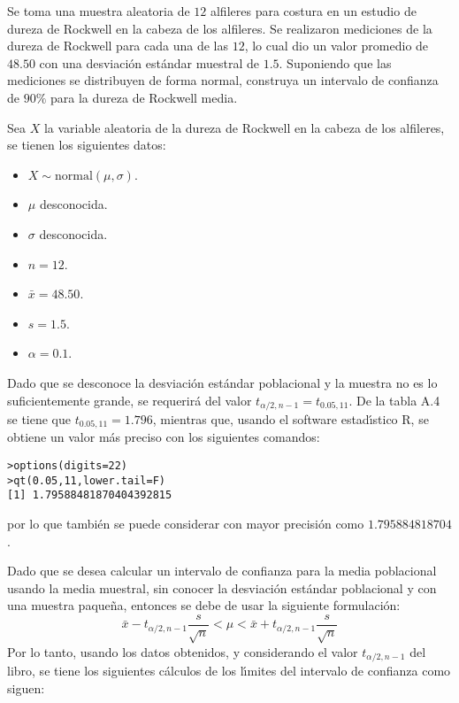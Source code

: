 \begin{enunciado}
 Se toma una muestra aleatoria de $12$ alfileres para costura en un estudio de dureza de Rockwell en la cabeza de los alfileres. Se realizaron mediciones de la dureza de Rockwell para cada una de las $12$, lo cual dio un valor promedio de $48.50$ con una desviaci\'on est\'andar muestral de $1.5$. Suponiendo que las mediciones se distribuyen de forma normal, construya un intervalo de confianza de $90\%$ para la dureza de Rockwell media.
\end{enunciado}

\begin{solucion}
 Sea $X$ la variable aleatoria de la dureza de Rockwell en la cabeza de los alfileres, se tienen los siguientes datos:
 \begin{itemize}
  \item $X\sim\text{normal}(\mu,\sigma)$.
  \item $\mu$ desconocida.
  \item $\sigma$ desconocida.
  \item $n = 12$.
  \item $\bar{x} = 48.50$.
  \item $s = 1.5$.
  \item $\alpha = 0.1$.
 \end{itemize}
 Dado que se desconoce la desviaci\'on est\'andar poblacional y la muestra no es lo suficientemente grande, se requerir\'a del valor $t_{\alpha/2,n-1} = t_{0.05,11}$. De la tabla A.4 se tiene que $t_{0.05,11} = 1.796$, mientras que, usando el software estad\'{\i}stico R, se obtiene un valor m\'as preciso con los siguientes comandos:
 \begin{verbatim}
>options(digits=22)
>qt(0.05,11,lower.tail=F)
[1] 1.79588481870404392815
 \end{verbatim}
 \vspace{-0.5cm}
 por lo que tambi\'en se puede considerar con mayor precisi\'on como $1.795884818704$.
 \par 
 Dado que se desea calcular un intervalo de confianza para la media poblacional usando la media muestral, sin conocer la desviaci\'on est\'andar poblacional y con una muestra paque\~na, entonces se debe de usar la siguiente formulaci\'on:
 \begin{equation*}
  \bar{x} - t_{\alpha/2,n-1}\frac{s}{\sqrt{n}} < \mu < \bar{x} + t_{\alpha/2,n-1}\frac{s}{\sqrt{n}}
 \end{equation*}
 Por lo tanto, usando los datos obtenidos, y considerando el valor $t_{\alpha/2, n-1}$ del libro, se tiene los siguientes c\'alculos de los l\'{\i}mites del intervalo de confianza como siguen:

\end{solucion}
